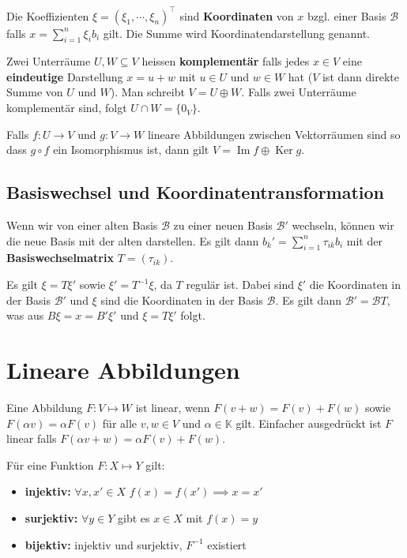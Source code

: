 \documentclass[a4paper,10pt]{article}
\def\K{\mathbb{K}}
\begin{document}
Die Koeffizienten $\xi = (\xi_1, \cdots, \xi_n)^\top$ sind \textbf{Koordinaten} von $x$ bzgl. einer Basis $\mathcal{B}$ falls $x = \sum_{i=1}^n \xi_i b_i$ gilt. Die Summe wird Koordinatendarstellung genannt.

Zwei Unterräume $U, W \subseteq V$ heissen \textbf{komplementär} falls jedes $x \in V$ eine \textbf{eindeutige} Darstellung $x = u + w$ mit $u \in U$ und $w \in W$ hat ($V$ ist dann direkte Summe von $U$ und $W$). Man schreibt $V = U \oplus W$. Falls zwei Unterräume komplementär sind, folgt $U \cap W = \{0_V\}$.

Falls  $f: U \rightarrow V$ und $g: V \rightarrow W$ lineare Abbildungen zwischen Vektorräumen sind so dass $ g \circ f$ ein Isomorphismus ist, dann gilt $V = \operatorname{Im}f \oplus \operatorname{Ker} g$.

\subsection{Basiswechsel und Koordinatentransformation}

Wenn wir von einer alten Basis $\mathcal{B}$ zu einer neuen Basis $\mathcal{B}'$ wechseln, können wir die neue Basis mit der alten darstellen. Es gilt dann $b_k' = \sum_{i=1}^n \tau_{ik} b_i$ mit der \textbf{Basiswechselmatrix} $T = (\tau_{ik})$.

Es gilt $\xi = T \xi'$ sowie $\xi' = T^{-1} \xi$, da $T$ regulär ist. Dabei sind $\xi'$ die Koordinaten in der Basis $\mathcal{B}'$ und $\xi$ sind die Koordinaten in der Basis $\mathcal{B}$. Es gilt dann $\mathcal{B}' = \mathcal{B} T$, was aus $B \xi = x = B' \xi'$ und $\xi = T \xi'$ folgt.

\section{Lineare Abbildungen}

Eine Abbildung $F: V \mapsto W$ ist linear, wenn $F(v + w) = F(v) + F(w)$ sowie $F(\alpha v) = \alpha F(v)$ für alle $v, w \in V$ und $\alpha \in \K$ gilt. Einfacher ausgedrückt ist $F$ linear falls $F(\alpha v + w) = \alpha F(v) + F(w)$. 

Für eine Funktion $F: X \mapsto Y$ gilt:
\begin{itemize}
  \item \textbf{injektiv:} $\forall x, x' \in X$ $f(x) = f(x') \implies x = x'$
  \item \textbf{surjektiv:} $\forall y \in Y$ gibt es $x \in X$ mit $f(x) = y$
  \item \textbf{bijektiv:} injektiv und surjektiv, $F^{-1}$ existiert
\end{itemize}
\end{document}
